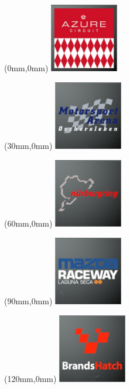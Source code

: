 \begin{textblock*}{30mm}(0mm,0mm)%
\includegraphics[width=30mm]{LG/2015-05-20_00072.png}
\end{textblock*}
\begin{textblock*}{30mm}(30mm,0mm)%
\includegraphics[width=30mm]{LG/2015-05-20_00090.png}
\end{textblock*}
\begin{textblock*}{30mm}(60mm,0mm)%
\includegraphics[width=30mm]{LG/2015-05-20_00089.png}
\end{textblock*}
\begin{textblock*}{30mm}(90mm,0mm)%
\includegraphics[width=30mm]{LG/2015-05-20_00085.png}
\end{textblock*}
\begin{textblock*}{30mm}(120mm,0mm)%
\includegraphics[width=30mm]{LG/2015-05-20_00074.png}
\end{textblock*}
